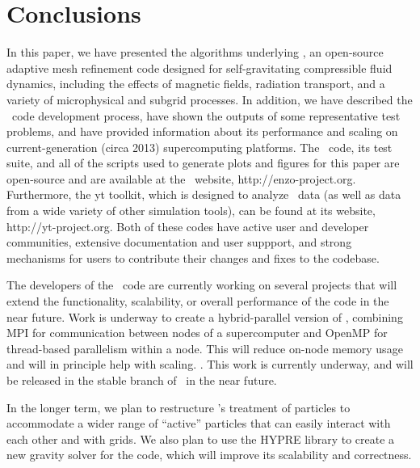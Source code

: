 
\section{Conclusions}

In this paper, we have presented the algorithms underlying \enzo, an
open-source adaptive mesh refinement code designed for
self-gravitating compressible fluid dynamics, including the effects of
magnetic fields, radiation transport, and a variety of microphysical
and subgrid processes.  In addition, we have described the \enzo\ code
development process, have shown the outputs of some representative
test problems, and have provided information about its performance and
scaling on current-generation (circa 2013) supercomputing platforms.
The \enzo\ code, its test suite, and all of the scripts used to
generate plots and figures for this paper are open-source and are
available at the \enzo\ website, http://enzo-project.org.
Furthermore, the yt toolkit, which is designed to analyze \enzo\ data
(as well as data from a wide variety of other simulation tools), can
be found at its website, http://yt-project.org.  Both of these codes
have active user and developer communities, extensive documentation
and user suppport, and strong mechanisms for
users to contribute their changes and fixes to the codebase.

The developers of the \enzo\ code are currently working on several
projects that will extend the functionality, scalability, or overall
performance of the code in the near future.  Work is
underway to create a hybrid-parallel version of \enzo, combining MPI
for communication between nodes of a supercomputer and OpenMP for
thread-based parallelism within a node.  This will reduce on-node
memory usage and will in principle help with scaling.  .
This work is currently underway, and will be released in the stable
branch of \enzo\ in the near
future.

In the longer term, we plan to restructure \enzo's treatment of
particles to accommodate a wider range of ``active'' particles that
can easily interact with each other and with grids.  We also plan to
use the HYPRE library to create a new gravity solver for the code,
which will improve its scalability and correctness.  


 